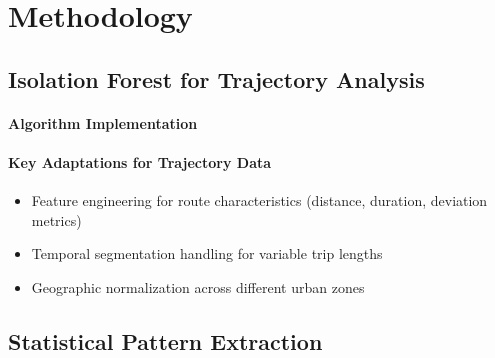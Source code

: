 \documentclass[runningheads]{llncs}
\begin{document}
\section{Methodology}
\label{sec:methodology}


\subsection{Isolation Forest for Trajectory Analysis}
\label{sec:iso}


\paragraph{Algorithm Implementation}

\paragraph{Key Adaptations for Trajectory Data}
\begin{itemize}
\item Feature engineering for route characteristics (distance, duration, deviation metrics)
\item Temporal segmentation handling for variable trip lengths
\item Geographic normalization across different urban zones
\end{itemize}


\subsection{Statistical Pattern Extraction}
\label{sec:pattern-extraction}
\end{document}
